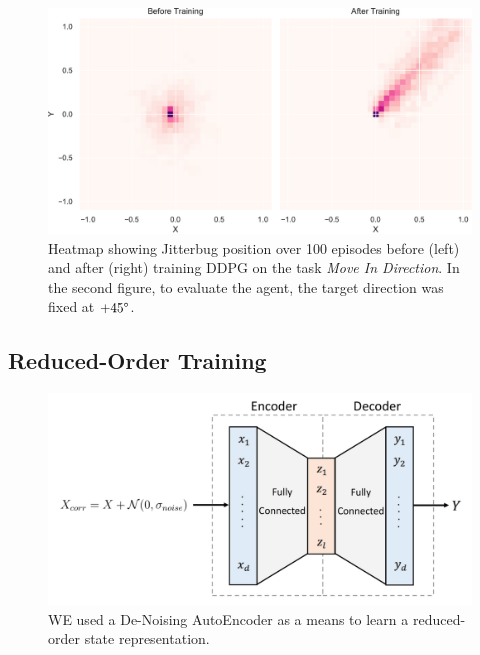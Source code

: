 \documentclass[letterpaper, 10 pt, conference]{ieeeconf}
\begin{document}
\begin{figure}[ht]
    \centering
    \includegraphics[width=\linewidth]{fig-heatmap}
    \caption{
        Heatmap showing Jitterbug position over 100 episodes before (left) and after (right) training DDPG on the task \emph{Move In Direction}.
        In the second figure, to evaluate the agent, the target direction was fixed at $+45\degree$.
    }
\label{fig:heatmap}
\end{figure}

\subsection{Reduced-Order Training}

\begin{figure}[ht]
    \centering
    \includegraphics[width=\linewidth]{fig-autoencoder}
    \caption{
        WE used a De-Noising AutoEncoder as a means to learn a reduced-order state representation.
    }
    \label{fig:autoencoder}
\end{figure}

\lipsum[1-9]
\end{document}
